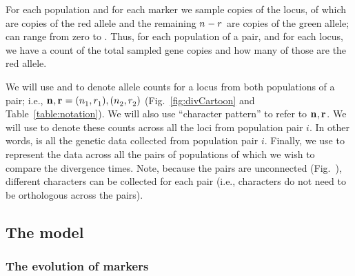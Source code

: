 For each population and for each marker we sample \allelecount
copies of the locus, \redallelecount of which are copies of the red
allele and the remaining $\allelecount - \redallelecount$ are
copies of the green allele;
\redallelecount can range from zero to \allelecount.
Thus, for each population of a pair, and for each locus, we have a count of the
total sampled gene copies and how many of those are the red allele.

\ifembed{

}{}

We will use \leafallelecounts and \leafredallelecounts to denote allele counts
for a locus from both populations of a pair; i.e., 
$\leafallelecounts, \leafredallelecounts = (\allelecount[1], \redallelecount[1]), 
(\allelecount[2], \redallelecount[2])$
(Fig.~\ref{fig:divCartoon}
and
Table~\ref{table:notation}).
We will also use ``character pattern'' to refer to $\leafallelecounts,
\leafredallelecounts$.
We will use \comparisondata[i] to denote these counts across all the loci from
population pair $i$.
In other words, \comparisondata[i] is all the genetic data collected from
population pair $i$.
Finally, we use \alldata to represent the data across all the pairs of
populations of which we wish to compare the divergence times.
Note, because the pairs are unconnected
(Fig.~),
different characters can be collected for each pair (i.e., characters do not
need to be orthologous across the pairs).

\ifembed{

}{}

\subsection{The model}

\subsubsection{The evolution of markers}


